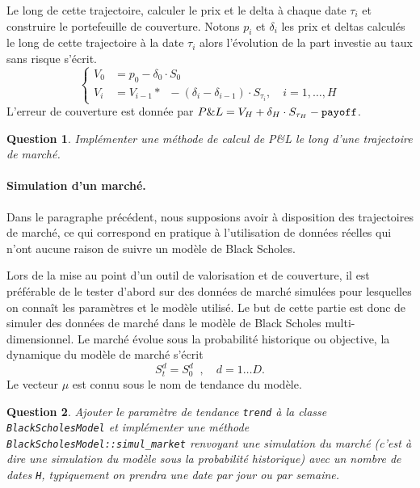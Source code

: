 \documentclass[a4paper,11pt]{article}
\def\expp#1{\mathop {\mathrm{e}^{ #1}}}
\def\var#1{{\tt #1}}
\newtheorem{question}{Question}
\begin{document}
Le long de cette trajectoire, calculer le prix et le delta à chaque date
$\tau_i$ et construire le portefeuille de couverture.  Notons $p_i$ et
$\delta_i$ les prix et deltas calculés le long de cette trajectoire à la date
$\tau_i$ alors l'évolution de la part investie au taux sans risque s'écrit.
\begin{equation*}
  \begin{cases}
    V_0 & = p_0 - \delta_0 \cdot S_0\\
  V_{i} & = V_{i-1} * \expp{\frac{r * T}{H}} -
  (\delta_{i} - \delta_{i-1}) \cdot S_{\tau_{i}}, \quad i=1,\dots,H
\end{cases}
\end{equation*}
L'erreur de couverture est donnée par $P\&L = V_{H} + \delta_H \cdot S_{\tau_H}
- \var{payoff}$.

\begin{question}
  Implémenter une méthode de calcul de P\&L le long d'une trajectoire de marché.
\end{question}

\paragraph{Simulation d'un marché.}

Dans le paragraphe précédent, nous supposions avoir à disposition des trajectoires de marché, ce qui correspond en pratique à l'utilisation de données réelles qui n'ont aucune raison de suivre un modèle de Black Scholes.

Lors de la mise au point d'un outil de valorisation et de couverture, il est préférable de le tester d'abord sur des données de marché simulées pour lesquelles on connaît les paramètres et le modèle utilisé. Le but de cette partie est donc de simuler des données de marché dans le modèle de Black Scholes multi-dimensionnel. Le marché évolue sous la probabilité historique ou objective, la dynamique du modèle de marché s'écrit
\begin{equation*}
  S_t^d = S_0^d \expp{(\mu^d- {(\sigma^d)}^2/2) t + \sigma^d L^d W_t}, \quad d=1\dots D.
\end{equation*}
Le vecteur $\mu$ est connu sous le nom de tendance du modèle.

\begin{question}
  Ajouter le paramètre de tendance \var{trend} à la classe \var{BlackScholesModel} et implémenter une méthode \var{BlackScholesModel::simul\_market} renvoyant une simulation du marché (c'est à dire une simulation du modèle sous la probabilité historique) avec un nombre de dates \var{H}, typiquement on prendra une date par jour ou par semaine.
\end{question}
\end{document}
